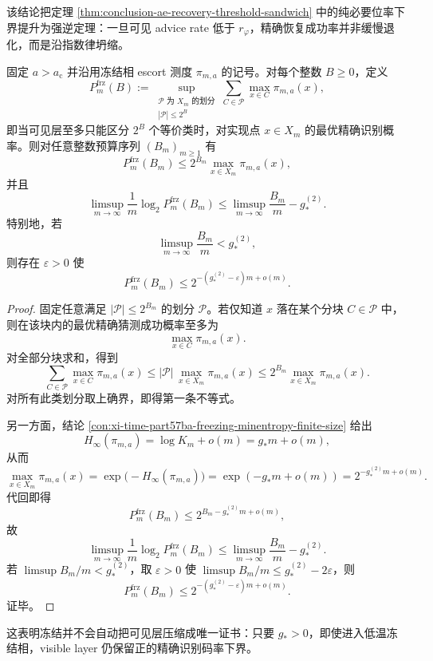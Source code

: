 该结论把定理 \ref{thm:conclusion-ae-recovery-threshold-sandwich} 中的纯必要位率下界提升为强逆定理：一旦可见 advice rate 低于 \(r_\varphi\)，精确恢复成功率并非缓慢退化，而是沿指数律坍缩。

\begin{theorem}[冻结相可见层的强逆定理]\label{thm:conclusion-solenoidal-rh-frozen-visible-strong-converse}
固定 \(a>a_{\mathrm c}\) 并沿用冻结相 escort 测度 \(\pi_{m,a}\) 的记号。对每个整数 \(B\ge 0\)，定义
\[
P_m^{\mathrm{frz}}(B)
:=
\sup_{\substack{\mathcal P\text{ 为 }X_m\text{ 的划分}\\ |\mathcal P|\le 2^B}}
\sum_{C\in\mathcal P}\max_{x\in C}\pi_{m,a}(x),
\]
即当可见层至多只能区分 \(2^B\) 个等价类时，对实现点 \(x\in X_m\) 的最优精确识别概率。则对任意整数预算序列 \((B_m)_{m\ge 1}\) 有
\[
P_m^{\mathrm{frz}}(B_m)\le 2^{B_m}\max_{x\in X_m}\pi_{m,a}(x),
\]
并且
\[
\limsup_{m\to\infty}\frac1m\log_2 P_m^{\mathrm{frz}}(B_m)
\le
\limsup_{m\to\infty}\frac{B_m}{m}-g_*^{(2)}.
\]
特别地，若
\[
\limsup_{m\to\infty}\frac{B_m}{m}<g_*^{(2)},
\]
则存在 \(\varepsilon>0\) 使
\[
P_m^{\mathrm{frz}}(B_m)\le 2^{-(g_*^{(2)}-\varepsilon)m+o(m)}.
\]
\end{theorem}
\begin{proof}
固定任意满足 \(|\mathcal P|\le 2^{B_m}\) 的划分 \(\mathcal P\)。若仅知道 \(x\) 落在某个分块 \(C\in\mathcal P\) 中，则在该块内的最优精确猜测成功概率至多为
\[
\max_{x\in C}\pi_{m,a}(x).
\]
对全部分块求和，得到
\[
\sum_{C\in\mathcal P}\max_{x\in C}\pi_{m,a}(x)
\le
|\mathcal P|\,\max_{x\in X_m}\pi_{m,a}(x)
\le
2^{B_m}\max_{x\in X_m}\pi_{m,a}(x).
\]
对所有此类划分取上确界，即得第一条不等式。

另一方面，结论 \ref{con:xi-time-part57ba-freezing-minentropy-finite-size} 给出
\[
H_\infty(\pi_{m,a})=\log K_m+o(m)=g_*m+o(m),
\]
从而
\[
\max_{x\in X_m}\pi_{m,a}(x)
=
\exp\!\bigl(-H_\infty(\pi_{m,a})\bigr)
=
\exp(-g_*m+o(m))
=
2^{-g_*^{(2)}m+o(m)}.
\]
代回即得
\[
P_m^{\mathrm{frz}}(B_m)\le 2^{B_m-g_*^{(2)}m+o(m)},
\]
故
\[
\limsup_{m\to\infty}\frac1m\log_2 P_m^{\mathrm{frz}}(B_m)
\le
\limsup_{m\to\infty}\frac{B_m}{m}-g_*^{(2)}.
\]
若 \(\limsup B_m/m<g_*^{(2)}\)，取 \(\varepsilon>0\) 使 \(\limsup B_m/m\le g_*^{(2)}-2\varepsilon\)，则
\[
P_m^{\mathrm{frz}}(B_m)\le 2^{-(g_*^{(2)}-\varepsilon)m+o(m)}.
\]
证毕。
\end{proof}

这表明冻结并不会自动把可见层压缩成唯一证书：只要 \(g_*>0\)，即使进入低温冻结相，visible layer 仍保留正的精确识别码率下界。

